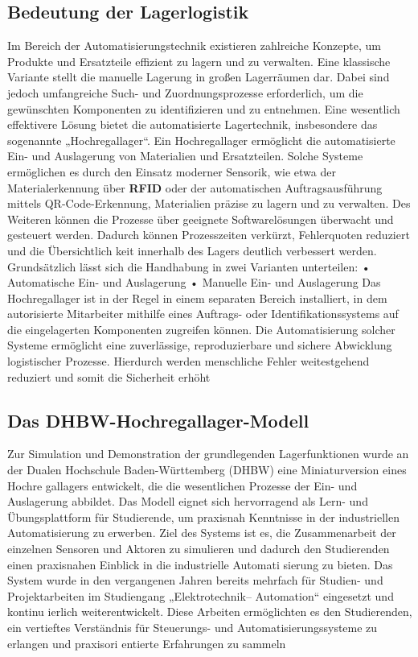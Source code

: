 \subsection{Bedeutung der Lagerlogistik}
Im Bereich der Automatisierungstechnik existieren zahlreiche Konzepte, um Produkte
und Ersatzteile effizient zu lagern und zu verwalten.
Eine klassische Variante stellt die manuelle Lagerung in großen Lagerräumen dar.
Dabei sind jedoch umfangreiche Such- und Zuordnungsprozesse erforderlich, um die
gewünschten Komponenten zu identifizieren und zu entnehmen.
Eine wesentlich effektivere Lösung bietet die automatisierte Lagertechnik, insbesondere
das sogenannte „Hochregallager“.
Ein Hochregallager ermöglicht die automatisierte Ein- und Auslagerung von Materialien
und Ersatzteilen. Solche Systeme ermöglichen es durch den Einsatz moderner Sensorik,
wie etwa der Materialerkennung über \textbf{RFID} oder der automatischen Auftragsausführung
mittels QR-Code-Erkennung, Materialien präzise zu lagern und zu verwalten. Des Weiteren können die Prozesse über geeignete Softwarelösungen überwacht und gesteuert
werden.
Dadurch können Prozesszeiten verkürzt, Fehlerquoten reduziert und die Übersichtlich
keit innerhalb des Lagers deutlich verbessert werden.
Grundsätzlich lässt sich die Handhabung in zwei Varianten unterteilen:
• Automatische Ein- und Auslagerung
• Manuelle Ein- und Auslagerung
Das Hochregallager ist in der Regel in einem separaten Bereich installiert, in dem
autorisierte Mitarbeiter mithilfe eines Auftrags- oder Identifikationssystems auf die
eingelagerten Komponenten zugreifen können.
Die Automatisierung solcher Systeme ermöglicht eine zuverlässige, reproduzierbare
und sichere Abwicklung logistischer Prozesse. Hierdurch werden menschliche Fehler
weitestgehend reduziert und somit die Sicherheit erhöht

\subsection{Das DHBW-Hochregallager-Modell}
Zur Simulation und Demonstration der grundlegenden Lagerfunktionen wurde an der
Dualen Hochschule Baden-Württemberg (DHBW) eine Miniaturversion eines Hochre
gallagers entwickelt, die die wesentlichen Prozesse der Ein- und Auslagerung abbildet.
Das Modell eignet sich hervorragend als Lern- und Übungsplattform für Studierende,
um praxisnah Kenntnisse in der industriellen Automatisierung zu erwerben. Ziel des
Systems ist es, die Zusammenarbeit der einzelnen Sensoren und Aktoren zu simulieren
und dadurch den Studierenden einen praxisnahen Einblick in die industrielle Automati
sierung zu bieten.
Das System wurde in den vergangenen Jahren bereits mehrfach für Studien- und
Projektarbeiten im Studiengang „Elektrotechnik– Automation“ eingesetzt und kontinu
ierlich weiterentwickelt. Diese Arbeiten ermöglichten es den Studierenden, ein vertieftes
Verständnis für Steuerungs- und Automatisierungssysteme zu erlangen und praxisori
entierte Erfahrungen zu sammeln

